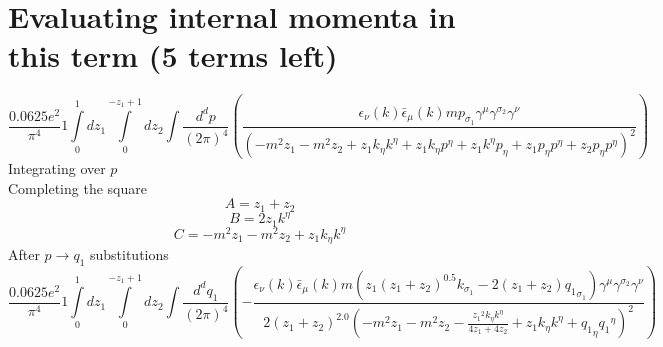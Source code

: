\section*{Evaluating internal momenta in this term (5 terms left)}
\begin{dmath}\frac{0.0625 e^{2}}{\pi^{4}}1\int\limits_{ 0 }^{ 1 } d{ z_{ 1 } }\int\limits_{ 0 }^{ - { z_{ 1 } } + 1 } d{ z_{ 2 } }\int\frac{d^d p }{ (2\pi)^4 }\left(\frac{\epsilon_{ \nu }({ k }) \bar{\epsilon}_{ \mu }({ k }) m { { p }_{ \sigma_1 } } { \gamma^{ \mu } } { \gamma^{ \sigma_2 } } { \gamma^{ \nu } }}{\left(- m^{2} { z_{ 1 } } - m^{2} { z_{ 2 } } + { z_{ 1 } } { { k }_{ \eta } } { { k }^{ \eta } } + { z_{ 1 } } { { k }_{ \eta } } { { p }^{ \eta } } + { z_{ 1 } } { { k }^{ \eta } } { { p }_{ \eta } } + { z_{ 1 } } { { p }_{ \eta } } { { p }^{ \eta } } + { z_{ 2 } } { { p }_{ \eta } } { { p }^{ \eta } }\right)^{2}}\right)\end{dmath}
Integrating over $p$\\
Completing the square\
\begin{dmath}A = { z_{ 1 } } + { z_{ 2 } }\end{dmath}
\begin{dmath}B = 2 { z_{ 1 } } { { k }^{ \eta } }\end{dmath}
\begin{dmath}C = - m^{2} { z_{ 1 } } - m^{2} { z_{ 2 } } + { z_{ 1 } } { { k }_{ \eta } } { { k }^{ \eta } }\end{dmath}
After $p \to q_1$ substitutions
\begin{dmath}\frac{0.0625 e^{2}}{\pi^{4}}1\int\limits_{ 0 }^{ 1 } d{ z_{ 1 } }\int\limits_{ 0 }^{ - { z_{ 1 } } + 1 } d{ z_{ 2 } }\int\frac{d^d q_1 }{ (2\pi)^4 }\left(- \frac{\epsilon_{ \nu }({ k }) \bar{\epsilon}_{ \mu }({ k }) m \left({ z_{ 1 } } \left({ z_{ 1 } } + { z_{ 2 } }\right)^{0.5} { { k }_{ \sigma_1 } } - 2 \left({ z_{ 1 } } + { z_{ 2 } }\right) { { q_1 }_{ \sigma_1 } }\right) { \gamma^{ \mu } } { \gamma^{ \sigma_2 } } { \gamma^{ \nu } }}{2 \left({ z_{ 1 } } + { z_{ 2 } }\right)^{2.0} \left(- m^{2} { z_{ 1 } } - m^{2} { z_{ 2 } } - \frac{{ z_{ 1 } }^{2} { { k }_{ \eta } } { { k }^{ \eta } }}{4 { z_{ 1 } } + 4 { z_{ 2 } }} + { z_{ 1 } } { { k }_{ \eta } } { { k }^{ \eta } } + { { q_1 }_{ \eta } } { { q_1 }^{ \eta } }\right)^{2}}\right)\end{dmath}
